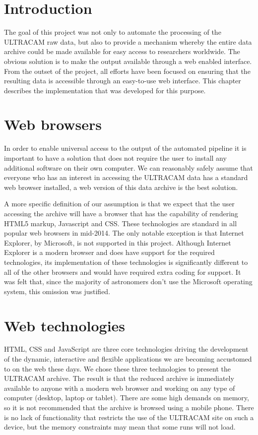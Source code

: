\section{Introduction} 
The goal of this project was not only to automate the processing of the ULTRACAM raw data, but also to provide a mechanism whereby the entire data archive could be made available for easy access to researchers worldwide. The obvious solution is to make the output available through a web enabled interface. From the outset of the project, all efforts have been focused on ensuring that the resulting data is accessible through an easy-to-use web interface. This chapter describes the implementation that was developed for this purpose. 

\section{Web browsers}
In order to enable universal access to the output of the automated pipeline it is important to have a solution that does not require the user to install any additional software on their own computer. We can reasonably safely assume that everyone who has an interest in accessing the ULTRACAM data has a standard web browser installed, a web version of this data archive is the best solution. 

A more specific definition of our assumption is that we expect that the user accessing the archive will have a browser that has the capability of rendering HTML5 markup, Javascript and CSS. These technologies are standard in all popular web browsers in mid-2014. The only notable exception is that Internet Explorer, by Microsoft, is not supported in this project. Although Internet Explorer is a modern browser and does have support for the required technologies, its implementation of these technologies is significantly different to all of the other browsers and would have required extra coding for support. It was felt that, since the majority of astronomers don't use the Microsoft operating system, this omission was justified.  

\section{Web technologies}
HTML, CSS and JavaScript are three core technologies driving the development of the dynamic, interactive and flexible applications we are becoming accustomed to on the web these days. We chose these three technologies to present the ULTRACAM archive. The result is that the reduced archive is immediately available to anyone with a modern web browser and working on any type of computer (desktop, laptop or tablet). There are some high demands on memory, so it is not recommended that the archive is browsed using a mobile phone. There is no lack of functionality that restricts the use of the ULTRACAM site on such a device, but the memory constraints may mean that some runs will not load.  

